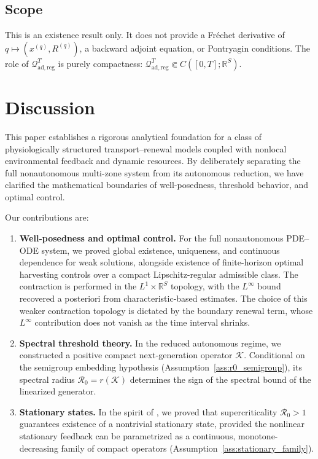 \documentclass[pdflatex,sn-mathphys-num]{sn-jnl}%
\begin{document}
\subsection{Scope}
This is an existence result only. It does not provide a Fr\'echet derivative of
\(q\mapsto(x^{(q)},R^{(q)})\), a backward adjoint equation, or Pontryagin conditions.
The role of \(\mathcal Q_{\mathrm{ad},\mathrm{reg}}^T\) is purely compactness:
\(\mathcal Q_{\mathrm{ad},\mathrm{reg}}^T\Subset C([0,T];\mathbb R^S)\).

\section{Discussion}\label{sec:discussion}
This paper establishes a rigorous analytical foundation for a class of physiologically
structured transport--renewal models coupled with nonlocal environmental feedback and
dynamic resources. By deliberately separating the full nonautonomous multi-zone system
from its autonomous reduction, we have clarified the mathematical boundaries of
well-posedness, threshold behavior, and optimal control.

Our contributions are:
\begin{enumerate}[label=\textup{(\roman*)}]
\item \textbf{Well-posedness and optimal control.} For the full nonautonomous PDE--ODE
system, we proved global existence, uniqueness, and continuous dependence for weak
solutions, alongside existence of finite-horizon optimal harvesting controls over a
compact Lipschitz-regular admissible class. The contraction is performed in the
\(L^1\times\mathbb R^S\) topology, with the \(L^\infty\) bound recovered a posteriori
from characteristic-based estimates. The choice of this weaker contraction topology
is dictated by the boundary renewal term, whose \(L^\infty\) contribution does not
vanish as the time interval shrinks.

\item \textbf{Spectral threshold theory.} In the reduced autonomous regime, we
constructed a positive compact next-generation operator \(\mathcal K\). Conditional on
the semigroup embedding hypothesis (Assumption~\ref{ass:r0_semigroup}), its spectral radius
\(\mathcal R_0=r(\mathcal K)\) determines the sign of the spectral bound of the
linearized generator.

\item \textbf{Stationary states.} In the spirit of \cite{yu2026fullcovariance,DiekmannGetto2005,barril2022formulation,yu2026pattern,yang2023threshold}, we proved that supercriticality
\(\mathcal R_0>1\) guarantees existence of a nontrivial stationary state, provided the
nonlinear stationary feedback can be parametrized as a continuous, monotone-decreasing
family of compact operators (Assumption~\ref{ass:stationary_family}).
\end{enumerate}
\end{document}
